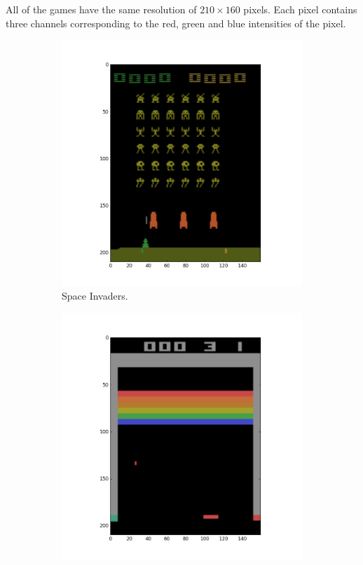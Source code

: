 \documentclass[11pt]{article}
\begin{document}
All of the games have the same resolution of $210 \times 160$ pixels.
Each pixel contains three channels corresponding to the red, green and blue intensities of the pixel.
\begin{figure}[H]
    \begin{subfigure}{.3\textwidth}
        \centering
        \includegraphics[scale=0.25]{include/space_invaders_1.png}
        \caption{Space Invaders.}
        \label{fig:scan}
    \end{subfigure}
    \begin{subfigure}{.3\textwidth}
        \centering
        \includegraphics[scale=0.25]{include/breakout_1.png}

\end{subfigure}
\end{figure}
\end{document}
